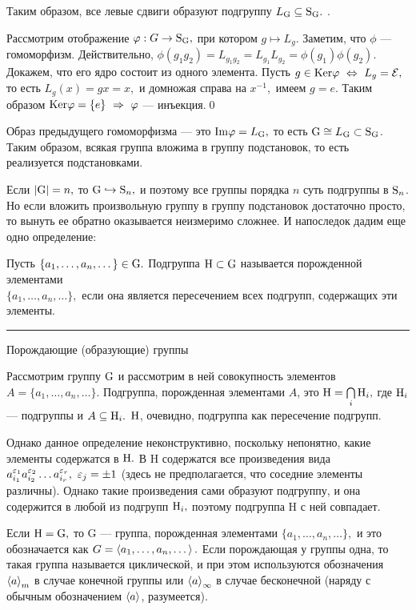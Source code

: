 Таким образом, все левые сдвиги образуют подгруппу $L_{\rm G}\subseteq {\rm S_G}.$
.
\par\dok Рассмотрим отображение $\varphi : G\rightarrow {\rm S_G},$ при котором $g\mapsto L_g.$ Заметим, что $\phi$ --- гомоморфизм.
Действительно, $\phi(g_1g_2)=L_{g_1g_2}=L_{g_1}L_{g_2}=\phi(g_1)\phi(g_2).$ Докажем, что его ядро состоит
из одного элемента. Пусть $g\in{\rm Ker}\varphi\ \Leftrightarrow\  L_g=\mathcal{E},$ то есть $L_g(x)=gx=x,$ и домножая справа на $x^{-1},$ имеем $g=e.$
Таким образом ${\rm Ker}\varphi=\{e\}\ \Rightarrow\  \varphi$ --- инъекция.\quad\qed
\par Образ предыдущего гомоморфизма --- это ${\rm Im}\varphi=L_{{\rm G}},$ то есть ${\rm G}\cong L_{\rm G}\subset{\rm S_G}$. Таким образом,
всякая группа вложима в группу подстановок, то есть реализуется подстановками.

Если $|{\rm G}|=n,$ то ${\rm G}\hookrightarrow{\rm S}_n,$ и поэтому {все группы порядка $n$ суть подгруппы в ${\rm S}_n$}. Но если вложить
произвольную группу в группу подстановок достаточно просто, то вынуть ее обратно оказывается неизмеримо сложнее. И напоследок дадим еще одно
определение:

\de Пусть $\{a_1,\dots,a_n,\dots\}\in {\rm G}.$ Подгруппа ${\rm H}\subset{\rm G}$ называется порожденной элементами\\ $\{a_1,\dots,a_n,\dots\},$ если она
является пересечением всех подгрупп, содержащих эти элементы.
\smallskip
\hrule
\rule{0pt}{10pt}
\centerline{Порождающие (образующие) группы}

Рассмотрим группу ${\rm G}$ и рассмотрим в ней совокупность элементов $A=\{a_1,\dots,a_n,\dots\}.$ Подгруппа, порожденная
элементами $A$, это ${\rm H}=\bigcap\limits_i{\rm H}_i,$ где ${\rm H}_i$ --- подгруппы и $A\subseteq {\rm H}_i.$ ${\rm H}$, очевидно, подгруппа как
пересечение подгрупп.

Однако данное определение неконструктивно, поскольку непонятно, какие элементы содержатся в ${\rm H}.$
В \mr H содержатся все произведения вида $a_{i_1}^{\varepsilon_1}a_{i_2}^{\varepsilon_2}\dots a_{i_r}^{\varepsilon_r},\ \varepsilon_j=\pm 1$ (здесь не предполагается, что
соседние элементы различны). Однако такие произведения сами образуют подгруппу, и она
содержится в любой из подгрупп ${\rm H}_i,$ поэтому подгруппа \mr H с ней совпадает.

Если ${\rm H=G},$ то \mr G --- группа, порожденная элементами $\{a_1,\dots,a_n,\dots\},$ и это обозначается как $G=\left\langle a_1,\dots,a_n,\dots\right\rangle.$
Если порождающая у группы одна, то такая группа называется циклической, и при этом используются обозначения $\left\langle a\right\rangle_m$ в случае конечной группы или
$\left\langle a\right\rangle_\infty$ в случае бесконечной (наряду с обычным обозначением $\left\langle a\right\rangle$, разумеется).

